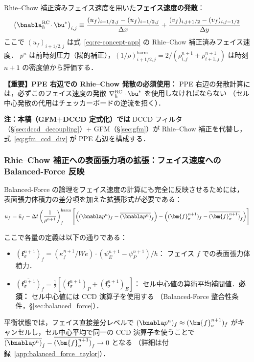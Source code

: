 Rhie--Chow 補正済みフェイス速度を用いた\textbf{フェイス速度の発散}：
\begin{equation}
  \bigl(\bnabla_h^{\mathrm{RC}}\!\cdot\bu^*\bigr)_{i,j}
  \equiv
  \frac{(u_f)_{i+1/2,j} - (u_f)_{i-1/2,j}}{\Delta x}
  + \frac{(v_f)_{i,j+1/2} - (v_f)_{i,j-1/2}}{\Delta y}
  \label{eq:rc_divergence}
\end{equation}
ここで $(u_f)_{i+1/2,j}$ は式~\eqref{eq:rc-concept-app} の Rhie--Chow 補正済みフェイス速度．
$p^n$ は前時刻圧力（陽的補正），$(1/\rho)^{\mathrm{harm}}_{i+1/2,j} = 2/(\rho^{n+1}_{i,j}+\rho^{n+1}_{i+1,j})$
は時刻 $n+1$ の密度値から評価する．

\noindent\textbf{【重要】PPE 右辺での Rhie--Chow 発散の必須使用：}
PPE 右辺の発散計算には，必ずこのフェイス速度の発散 $\nabla_h^{\mathrm{RC}}\cdot\bu^*$
を使用しなければならない
（セル中心発散の代用はチェッカーボードの逆流を招く）．

\noindent\textbf{注：本稿（GFM+DCCD 定式化）では}
DCCD フィルタ（§\ref{sec:dccd_decoupling}）+ GFM（§\ref{sec:gfm}）が
Rhie--Chow 補正を代替し，式~\eqref{eq:gfm_ccd_div} が PPE 右辺を構成する．

\subsubsection{Rhie--Chow 補正への表面張力項の拡張：フェイス速度への Balanced-Force 反映}
\label{app:rc_balanced_force}
\label{app:csf_balanced_force}

Balanced-Force の論理をフェイス速度の計算にも完全に反映させるためには，
表面張力体積力の差分項を加えた拡張形式が必要である：
\begin{equation}
  u_f = \bar{u}_f
    - \Delta t\left(\frac{1}{\rho^{n+1}}\right)_f^{\mathrm{harm}}
    \Biggl[
      \Bigl((\bnabla p^n)_f - \overline{(\bnabla p^n)}_f\Bigr)
      - \Bigl((\bm{f}_\sigma^{n+1})_f - \overline{(\bm{f}_\sigma^{n+1})}_f\Bigr)
    \Biggr]
  \label{eq:rc-face-balanced-app}
\end{equation}

ここで各量の定義は以下の通りである：
\begin{itemize}
  \item $(\bm{f}_\sigma^{n+1})_f = (\kappa_f^{n+1}/We)\cdot(\psi_E^{n+1}-\psi_P^{n+1})/h$：
        フェイス $f$ での表面張力体積力．
  \item $\overline{(\bm{f}_\sigma^{n+1})}_f = \tfrac{1}{2}[(\bm{f}_\sigma^{n+1})_P + (\bm{f}_\sigma^{n+1})_E]$：
        セル中心値の算術平均補間値．\textbf{必須：} セル中心値には CCD 演算子を使用する
        （Balanced-Force 整合性条件，§\ref{sec:balanced_force}）．
\end{itemize}

平衡状態では，フェイス直接差分レベルで $(\bnabla p^n)_f \approx (\bm{f}_\sigma^{n+1})_f$
がキャンセルし，セル中心平均で同一の CCD 演算子を使うことで
$\overline{(\bnabla p^n)}_f - \overline{(\bm{f}_\sigma^{n+1})}_f \to 0$ となる
（詳細は付録~\ref{app:balanced_force_taylor}）．
